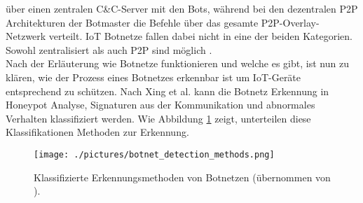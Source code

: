 über einen zentralen C\&C-Server mit den Bots, während bei den dezentralen P2P Architekturen der Botmaster die Befehle über das gesamte P2P-Overlay-Netzwerk verteilt. IoT Botnetze fallen dabei nicht in eine
der beiden Kategorien. Sowohl zentralisiert als auch P2P sind möglich \cite{DBLP:conf/csndsp/McNultyV22}. \\ Nach der Erläuterung wie Botnetze funktionieren und welche es gibt, ist nun zu klären, wie der 
Prozess eines Botnetzes erkennbar ist um IoT-Geräte entsprechend zu schützen. Nach Xing et al. \cite{Xing2021SurveyOB} kann die Botnetz Erkennung in Honeypot Analyse, Signaturen aus der Kommunikation und 
abnormales Verhalten klassifiziert werden. Wie Abbildung \ref{fig:bot_det_met} zeigt, unterteilen diese Klassifikationen Methoden zur Erkennung. 

\begin{figure}[h!]
    \centering
    \texttt{[image: ./pictures/botnet\_detection\_methods.png]}
    \caption{Klassifizierte Erkennungsmethoden von Botnetzen (übernommen von \cite{Xing2021SurveyOB}).}
    \label{fig:bot_det_met}
\end{figure}

